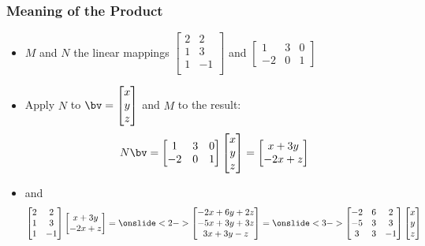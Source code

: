 \documentclass[8pt]{beamer}
\newcommand{\myemph}[1]{{\color{blue}{#1}}}
\begin{document}
\begin{frame}
  \frametitle{Meaning of the Product}
  \begin{itemize}
  \item $M$ and $N$ the linear mappings $
    \begin{bmatrix}
      2 & 2\\
      1 & 3\\
      1 & -1\\
    \end{bmatrix}
    $ and 
    $
    \begin{bmatrix}
      1 & 3 & 0\\
      -2 & 0 & 1
    \end{bmatrix}
    $
  \item
    Apply $N$ to $
    \bv = \begin{bmatrix}
      x \\ y \\ z
    \end{bmatrix}
    $
    and $M$ to the result:
    $$
    N \bv = \begin{bmatrix}
      1 & 3 & 0\\
      -2 & 0 & 1
    \end{bmatrix}\begin{bmatrix}
      x \\ y \\ z
    \end{bmatrix}
    = 
    \begin{bmatrix}
      x + 3y\\
      -2x + z
    \end{bmatrix}
    $$
    \item and{\small
      $$
      \begin{bmatrix}
      2 & 2\\
      1 & 3\\
      1 & -1\\
    \end{bmatrix}
     \begin{bmatrix}
      x + 3y\\
      -2x + z
    \end{bmatrix}
    =\onslide<2->
    \begin{bmatrix}
      -2x+6y+2z\\
      -5x + 3y+3z\\
      3x + 3y-z
    \end{bmatrix}
    =\onslide<3->
    \begin{bmatrix}
      -2 & 6 & 2\\      -5 & 3 & 3\\
      3 & 3 & -1
    \end{bmatrix}
    \begin{bmatrix}
      x\\y\\z
    \end{bmatrix}
    $$}
  \end{itemize}
\end{frame}
\end{document}
